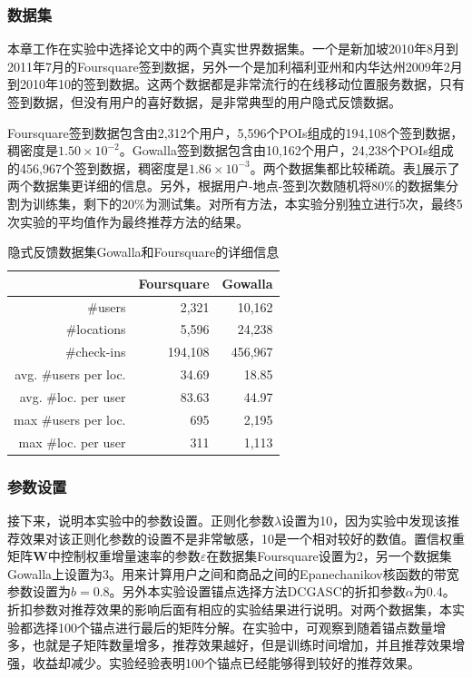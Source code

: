 \subsubsection{数据集}
本章工作在实验中选择论文\cite{yuan2013time}中的两个真实世界数据集。一个是新加坡2010年8月到2011年7月的Foursquare签到数据，另外一个是加利福利亚州和内华达州2009年2月到2010年10的签到数据。这两个数据都是非常流行的在线移动位置服务数据，只有签到数据，但没有用户的喜好数据，是非常典型的用户隐式反馈数据。

Foursquare签到数据包含由2,312个用户，5,596个POIs组成的194,108个签到数据，稠密度是$1.50\times10^{-2}$。Gowalla签到数据包含由10,162个用户，24,238个POIs组成的456,967个签到数据，稠密度是$1.86\times10^{-3}$。两个数据集都比较稀疏。表\ref{tab-lwmf-stat}展示了两个数据集更详细的信息。另外，根据用户-地点-签到次数随机将80\%的数据集分割为训练集，剩下的20\%为测试集。对所有方法，本实验分别独立进行5次，最终5次实验的平均值作为最终推荐方法的结果。

\begin{table}
	\centering
	\caption{隐式反馈数据集Gowalla和Foursquare的详细信息}
	\begin{tabular}{|r||r|r|}
		\hline
		& Foursquare & Gowalla \bigstrut\\
		\hline
		\hline
		\#users & 2,321 & 10,162 \bigstrut\\
		\hline
		\#locations & 5,596 & 24,238 \bigstrut\\
		\hline
		\#check-ins & 194,108 & 456,967 \bigstrut\\
		\hline
		avg. \#users per loc. & 34.69 & 18.85 \bigstrut\\
		\hline
		avg. \#loc. per user & 83.63 & 44.97 \bigstrut\\
		\hline
		max \#users per loc. & 695   & 2,195 \bigstrut\\
		\hline
		max \#loc. per user & 311   & 1,113 \bigstrut\\
		\hline
	\end{tabular}%
	\label{tab-lwmf-stat}%
\end{table}%

\subsubsection{参数设置}

接下来，说明本实验中的参数设置。正则化参数$\lambda$设置为10，因为实验中发现该推荐效果对该正则化参数的设置不是非常敏感，10是一个相对较好的数值。置信权重矩阵$\mathbf{W}$中控制权重增量速率的参数$\varepsilon$在数据集Foursquare设置为2，另一个数据集Gowalla上设置为3。用来计算用户之间和商品之间的Epanechanikov核函数的带宽参数设置为$b=0.8$。另外本实验设置锚点选择方法DCGASC的折扣参数$\alpha$为0.4。折扣参数对推荐效果的影响后面有相应的实验结果进行说明。对两个数据集，本实验都选择100个锚点进行最后的矩阵分解。在实验中，可观察到随着锚点数量增多，也就是子矩阵数量增多，推荐效果越好，但是训练时间增加，并且推荐效果增强，收益却减少。实验经验表明100个锚点已经能够得到较好的推荐效果。

